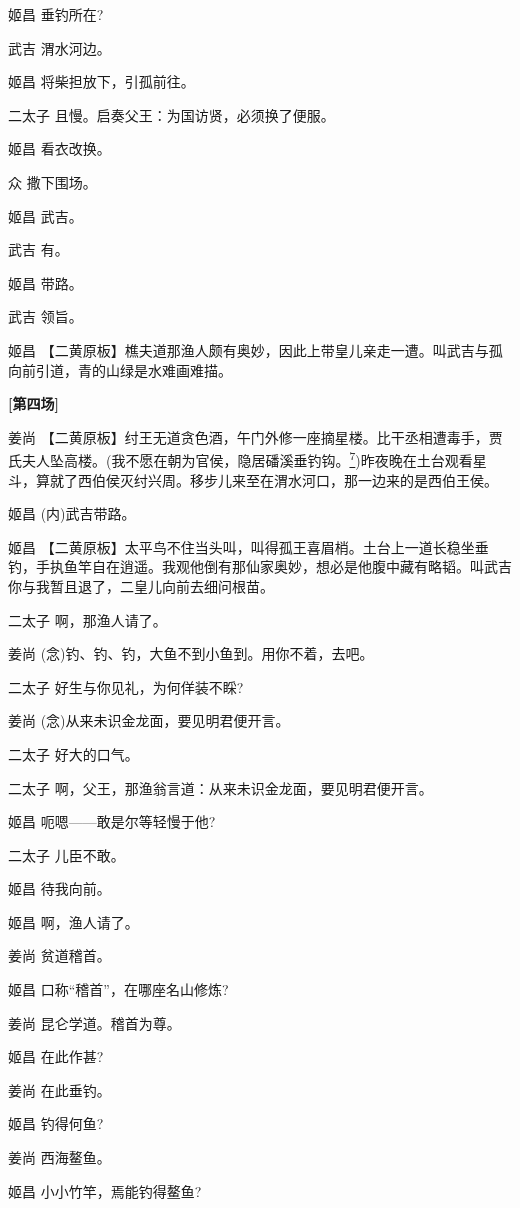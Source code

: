 姬昌 垂钓所在?

武吉 渭水河边。

姬昌 将柴担放下，引孤前往。

二太子 且慢。启奏父王：为国访贤，必须换了便服。

姬昌 看衣改换。

众 撒下围场。

姬昌 武吉。

武吉 有。

姬昌 带路。

武吉 领旨。

姬昌
【二黄原板】樵夫道那渔人颇有奥妙，因此上带皇儿亲走一遭。叫武吉与孤向前引道，青的山绿是水难画难描。

\textbf{{[}第四场{]}}

姜尚
【二黄原板】纣王无道贪色酒，午门外修一座摘星楼。比干丞相遭毒手，贾氏夫人坠高楼。(我不愿在朝为官侯，隐居磻溪垂钓钩。\protect\hyperlink{fn7}{\textsuperscript{7}})昨夜晚在土台观看星斗，算就了西伯侯灭纣兴周。移步儿来至在渭水河口，那一边来的是西伯王侯。

姬昌 (内)武吉带路。

姬昌
【二黄原板】太平鸟不住当头叫，叫得孤王喜眉梢。土台上一道长稳坐垂钓，手执鱼竿自在逍遥。我观他倒有那仙家奥妙，想必是他腹中藏有略韬。叫武吉你与我暂且退了，二皇儿向前去细问根苗。

二太子 啊，那渔人请了。

姜尚 (念)钓、钓、钓，大鱼不到小鱼到。用你不着，去吧。

二太子 好生与你见礼，为何佯装不睬?

姜尚 (念)从来未识金龙面，要见明君便开言。

二太子 好大的口气。

二太子 啊，父王，那渔翁言道：从来未识金龙面，要见明君便开言。

姬昌 呃嗯------敢是尔等轻慢于他?

二太子 儿臣不敢。

姬昌 待我向前。

姬昌 啊，渔人请了。

姜尚 贫道稽首。

姬昌 口称``稽首''，在哪座名山修炼?

姜尚 昆仑学道。稽首为尊。

姬昌 在此作甚?

姜尚 在此垂钓。

姬昌 钓得何鱼?

姜尚 西海鳌鱼。

姬昌 小小竹竿，焉能钓得鳌鱼?

